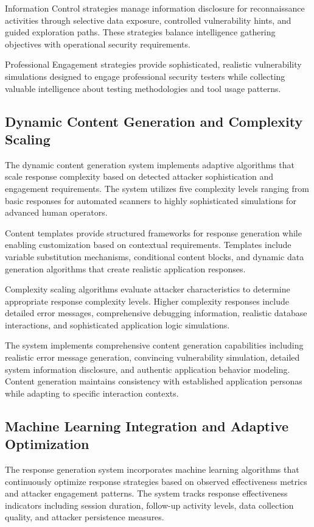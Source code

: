 Information Control strategies manage information disclosure for reconnaissance activities through selective data exposure, controlled vulnerability hints, and guided exploration paths. These strategies balance intelligence gathering objectives with operational security requirements.

Professional Engagement strategies provide sophisticated, realistic vulnerability simulations designed to engage professional security testers while collecting valuable intelligence about testing methodologies and tool usage patterns.

\subsection{Dynamic Content Generation and Complexity Scaling}

The dynamic content generation system implements adaptive algorithms that scale response complexity based on detected attacker sophistication and engagement requirements. The system utilizes five complexity levels ranging from basic responses for automated scanners to highly sophisticated simulations for advanced human operators.

Content templates provide structured frameworks for response generation while enabling customization based on contextual requirements. Templates include variable substitution mechanisms, conditional content blocks, and dynamic data generation algorithms that create realistic application responses.

Complexity scaling algorithms evaluate attacker characteristics to determine appropriate response complexity levels. Higher complexity responses include detailed error messages, comprehensive debugging information, realistic database interactions, and sophisticated application logic simulations.

The system implements comprehensive content generation capabilities including realistic error message generation, convincing vulnerability simulation, detailed system information disclosure, and authentic application behavior modeling. Content generation maintains consistency with established application personas while adapting to specific interaction contexts.

\subsection{Machine Learning Integration and Adaptive Optimization}

The response generation system incorporates machine learning algorithms that continuously optimize response strategies based on observed effectiveness metrics and attacker engagement patterns. The system tracks response effectiveness indicators including session duration, follow-up activity levels, data collection quality, and attacker persistence measures.

